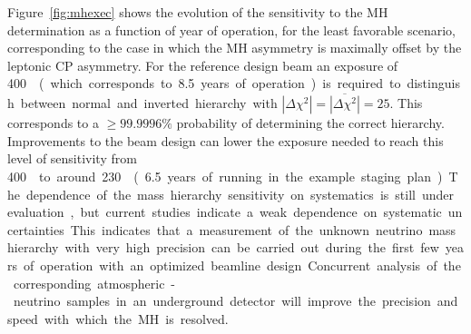 Figure~\ref{fig:mhexec} shows the evolution of the sensitivity to the MH determination as a function
of year of operation, for the least favorable scenario, corresponding to the case in which the MH asymmetry is
maximally offset by the leptonic CP asymmetry. For the reference design beam an exposure of \SI{400}\ktMWyr{}  
(which corresponds to \num{8.5} years of operation) is required to distinguish
between normal and inverted hierarchy with $|\Delta \chi^2| =
\overline{|\Delta \chi^2|} = 25$.  This corresponds to a $\geq
99.9996\%$ probability of determining the correct hierarchy. 
Improvements to the beam design can
lower the exposure needed to reach this level of sensitivity from
\SI{400}\ktMWyr{} to around \SI{230}\ktMWyr{} (\num{6.5} years of
running in the example staging plan). The dependence of the mass
hierarchy sensitivity on systematics is still under evaluation, but
current studies indicate a weak dependence on systematic
uncertainties. This indicates that a measurement of the unknown
neutrino mass hierarchy with very high precision can be carried out
during the first few years of operation with an optimized beamline
design. Concurrent analysis of the corresponding atmospheric-neutrino
samples in an underground detector will improve the precision and
speed with which the MH is resolved.





